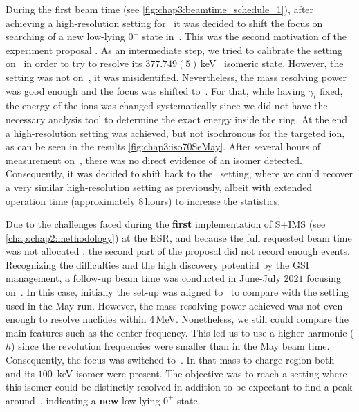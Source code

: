 During the first beam time (see \cref{fig:chap3:beamtime_schedule_1}), after achieving a high-resolution setting for \, it was decided to shift the focus on searching of a new low-lying $0^+$ state in \,. This was the second motivation of the experiment proposal \cite{kortenE143}. As an intermediate step, we tried to calibrate the setting on \, in order to try to resolve its $377.749 (5)$\,keV~\cite{ENSDF} isomeric state. However, the setting was not on \,, it was misidentified. Nevertheless, the mass resolving power was good enough and the focus was shifted to \,. For that, while having $\gamma_t$ fixed, the energy of the ions was changed systematically since we did not have the necessary analysis tool to determine the exact energy inside the ring. At the end a high-resolution setting was achieved, but not isochronous for the targeted ion, as can be seen in the results \cref{fig:chap3:iso70SeMay}. 
After several hours of measurement on \,, there was no direct evidence of an isomer detected. Consequently, it was decided to shift back to the \, setting, where we could recover a very similar high-resolution setting as previously, albeit with extended operation time (approximately $8$\,hours) to increase the statistics. 

Due to the challenges faced during the \textbf{first} implementation of \textsc{S+IMS} (see \cref{chap:chap2:methodology}) at the \textsc{ESR}, and because the full requested beam time was not allocated \cite{kortenE143}, the second part of the proposal did not record enough events. 
Recognizing the difficulties and the high discovery potential by the \textsc{GSI} management, a follow-up beam time was conducted in June-July $2021$ focusing on \,.
In this case, initially the set-up was aligned to \, to compare with the setting used in the May run. However, the mass resolving power achieved was not even enough to resolve nuclides within $4$\,MeV. Nonetheless, we still could compare the main features such as the center frequency. This led us to use a higher harmonic ($h$) since the revolution frequencies were smaller than in the May beam time.
Consequently, the focus was switched to \,. In that mass-to-charge region both \, and its $100$~keV isomer were present. The objective was to reach a setting where this isomer could be distinctly resolved in addition to be expectant to find a peak around \,, indicating a \textbf{new} low-lying $0^+$ state. 
